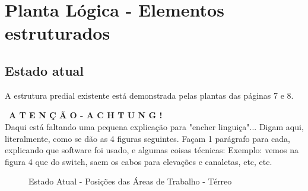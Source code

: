 \documentclass[	DIV=calc,%
							paper=a4,%
							fontsize=12pt,%
							onecolumn]{scrartcl}	 					%
\begin{document}

\section{Planta Lógica - Elementos estruturados}

\subsection{Estado atual}

A estrutura predial existente está demonstrada pelas plantas das páginas 7 e 8.

\
\textbf{A T E N Ç Ã O - A C H T U N G !}
\\
Daqui está faltando uma pequena explicação para "encher linguiça"... Digam aqui, literalmente, como se dão as 4 figuras seguintes. Façam 1 parágrafo para cada, explicando que software foi usado, e algumas coisas técnicas: Exemplo: vemos na figura 4 que do switch, saem os cabos para elevações e canaletas, etc, etc.


\clearpage 
\thispagestyle{plain}
\recalctypearea
\begin{figure}
	\noindent{}
		\caption[Estado Atual - Posições das Áreas de Trabalho - Térreo]{Estado Atual - Posições das Áreas de Trabalho - Térreo}
	\label{figura3}
\end{figure}
\end{document}
